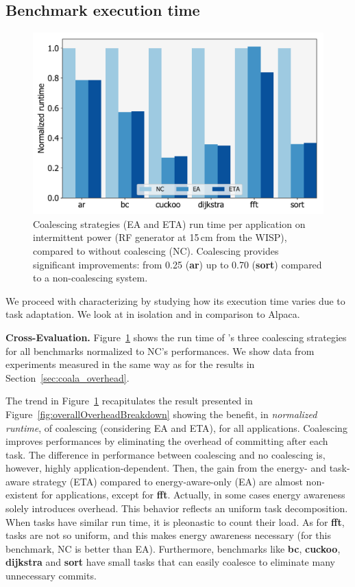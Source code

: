 \subsection{Benchmark execution time}
\label{sec:result_coalescing}

\begin{figure}
	\centering
	\includegraphics[width=0.5\columnwidth]{figures/coalStrategies}
	\caption{Coalescing strategies (EA and ETA) run time per application on intermittent power (RF generator at 15\,cm from the WISP), compared to \sys without coalescing (NC). Coalescing provides significant improvements: from 0.25 (\textbf{ar}) up to 0.70 (\textbf{sort}) compared to a non-coalescing system.}
	\label{fig:coalescing}
\end{figure}

We proceed with characterizing \sys by studying how its execution time varies due to task adaptation. We look at \sys in isolation and in comparison to Alpaca.

\textbf{\sys Cross-Evaluation.} Figure~\ref{fig:coalescing} shows the run time of \sys's three coalescing strategies for all benchmarks normalized to NC's performances. We show data from experiments measured in the same way as for the results in Section~\ref{sec:coala_overhead}. 

The trend in Figure~\ref{fig:coalescing} recapitulates the result presented in Figure~\ref{fig:overallOverheadBreakdown} showing the benefit, in \emph {normalized runtime}, of coalescing (considering EA and ETA), for all applications. Coalescing improves performances by eliminating the overhead of committing after each task. The difference in performance between coalescing and no coalescing is, however, highly application-dependent. Then, the gain from the energy- and task-aware strategy (ETA) compared to energy-aware-only (EA) are almost non-existent for applications, except for \textbf{fft}. Actually, in some cases energy awareness solely introduces overhead. This behavior reflects an uniform task decomposition. When tasks have similar run time, it is pleonastic to count their load. As for \textbf{fft}, tasks are not so uniform, and this makes energy awareness necessary (for this benchmark, NC is better than EA). Furthermore, benchmarks like \textbf{bc}, \textbf{cuckoo}, \textbf{dijkstra} and \textbf{sort} have small tasks that \sys can easily coalesce to eliminate many unnecessary commits.

